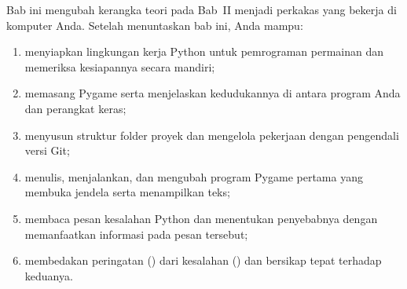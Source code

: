 \begin{tujuanbox}
Bab ini mengubah kerangka teori pada Bab~II menjadi perkakas yang bekerja di
komputer Anda. Setelah menuntaskan bab ini, Anda mampu:
\begin{enumerate}
  \item menyiapkan lingkungan kerja Python untuk pemrograman permainan dan
        memeriksa kesiapannya secara mandiri;
  \item memasang Pygame serta menjelaskan kedudukannya di antara program Anda
        dan perangkat keras;
  \item menyusun struktur folder proyek dan mengelola pekerjaan dengan
        pengendali versi Git;
  \item menulis, menjalankan, dan mengubah program Pygame pertama yang
        membuka jendela serta menampilkan teks;
  \item membaca pesan kesalahan Python dan menentukan penyebabnya dengan
        memanfaatkan informasi pada pesan tersebut;
  \item membedakan peringatan () dari kesalahan
        () dan bersikap tepat terhadap keduanya.
\end{enumerate}
\end{tujuanbox}
